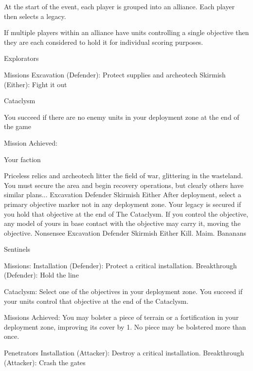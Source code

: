 
At the start of the event, each player is grouped into an alliance.
Each player then selects a legacy.

If multiple players within an alliance have units controlling a single
objective then they are each considered to hold it for individual
scoring purposes.


Explorators

Missions
  Excavation (Defender): Protect supplies and archeotech
  Skirmish (Either): Fight it out

Cataclysm
    
  You succeed if there are no enemy units in your deployment zone at the end of the game

Mission Achieved:

  Your faction

\squelchbackground

\begin{landscape}%
\vspace*{-15pt}%
\noindent{}%
{Priceless relics and archeotech litter the field of war, glittering
  in the wasteland.  You must secure the area and begin recovery
  operations, but clearly others have similar plans...}%
{Excavation}%
{Defender}%
{Skirmish}%
{Either}%
{After deployment, select a primary objective marker not in any deployment zone.  Your legacy is secured if you hold that objective at the end of The Cataclysm.}
{If you control the objective, any model of yours in base contact with the objective may carry it, moving the objective.}
\hfill%
%
{Nonsensee}%
{Excavation}%
{Defender}%
{Skirmish}%
{Either}%
{Kill.  Maim.}
{Bananans}%
\end{landscape}

\restorebackground

Sentinels

Missions:
  Installation (Defender): Protect a critical installation.
  Breakthrough (Defender): Hold the line

Cataclysm:
  Select one of the objectives in your deployment zone.
  You succeed if your units control that objective at the end of the Cataclysm.

Missions Achieved:
  You may bolster a piece of terrain or a fortification in your
  deployment zone, improving its cover by 1.
  No piece may be bolstered more than once.


Penetrators
  Installation (Attacker): Destroy a critical installation.
  Breakthrough (Attacker): Crash the gates

